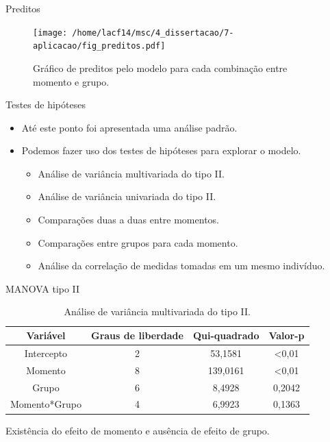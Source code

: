 \documentclass[
  ignorenonframetext,
  serif,
  professionalfont,
  usenames,
  dvipsnames,
  aspectratio = 169]{beamer}
\begin{document}
\begin{frame}{Preditos}
\protect\hypertarget{preditos}{}
\begin{figure}[H]
\centering
\texttt{[image: /home/lacf14/msc/4\_dissertacao/7-aplicacao/fig\_preditos.pdf]}
\caption{Gráfico de preditos pelo modelo para cada combinação entre momento e grupo.}
\label{fig:preds}
\end{figure}
\end{frame}

\begin{frame}{Testes de hipóteses}
\protect\hypertarget{testes-de-hipuxf3teses-4}{}
\begin{itemize}
  \itemsep 2ex
  
  \item Até este ponto foi apresentada uma análise padrão. 

  \item Podemos fazer uso dos testes de hipóteses para explorar o modelo.
  
  \begin{itemize}
    \item Análise de variância multivariada do tipo II.
    \item Análise de variância univariada do tipo II.
    \item Comparações duas a duas entre momentos.
    \item Comparações entre grupos para cada momento.
    \item Análise da correlação de medidas tomadas em um mesmo indivíduo.
  \end{itemize}
  
\end{itemize}
\end{frame}

\begin{frame}{MANOVA tipo II}
\protect\hypertarget{manova-tipo-ii}{}
\begin{table}[H]
\centering
\begin{tabular}{cccc}
\hline
Variável      & Graus de liberdade & Qui-quadrado & Valor-p        \\ \hline
Intercepto    & 2                  & 53,1581      & \textless 0,01 \\
Momento       & 8                  & 139,0161     & \textless 0,01 \\
Grupo         & 6                  & 8,4928       & 0,2042         \\
Momento*Grupo & 4                  & 6,9923       & 0,1363         \\ \hline
\end{tabular}
\caption{Análise de variância multivariada do tipo II.}
\label{tab:manovaII}
\end{table}

Existência do efeito de momento e ausência de efeito de grupo.
\end{frame}
\end{document}
